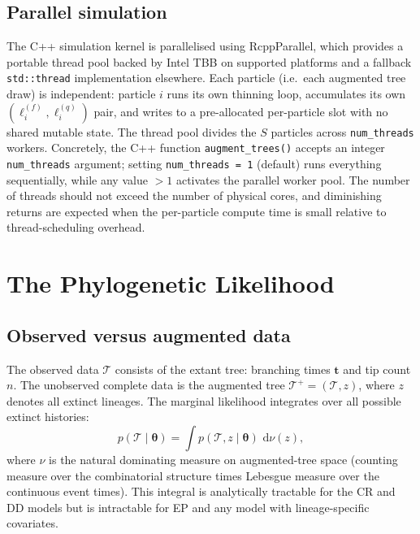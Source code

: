 \documentclass[12pt,a4paper]{article}
\newcommand{\obs}{\mathcal{T}}
\newcommand{\aug}{\mathcal{T}^+}
\newcommand{\brts}{\mathbf{t}}
\newcommand{\pars}{\bm{\theta}}
\newcommand{\logf}{\ell^{(f)}}
\newcommand{\logq}{\ell^{(q)}}
\newcommand{\dd}{\,\mathrm{d}}
\begin{document}
\subsection{Parallel simulation}

The C++ simulation kernel is parallelised using \textsf{RcppParallel}, which
provides a portable thread pool backed by Intel TBB on supported platforms and
a fallback \texttt{std::thread} implementation elsewhere. Each particle (i.e.\
each augmented tree draw) is independent: particle $i$ runs its own
thinning loop, accumulates its own $(\logf_i, \logq_i)$ pair, and writes to
a pre-allocated per-particle slot with no shared mutable state. The
thread pool divides the $S$ particles across \texttt{num\_threads} workers.
Concretely, the C++ function \texttt{augment\_trees()} accepts an integer
\texttt{num\_threads} argument; setting \texttt{num\_threads = 1} (default)
runs everything sequentially, while any value $>1$ activates the parallel
worker pool. The number of threads should not exceed the number of physical
cores, and diminishing returns are expected when the per-particle compute
time is small relative to thread-scheduling overhead.

\section{The Phylogenetic Likelihood}\label{sec:likelihood}

\subsection{Observed versus augmented data}

The observed data $\obs$ consists of the extant tree: branching times
$\brts$ and tip count $n$. The unobserved complete data is the augmented
tree $\aug = (\obs, z)$, where $z$ denotes all extinct lineages. The
marginal likelihood integrates over all possible extinct histories:
\begin{equation}\label{eq:marginal}
  p(\obs \mid \pars) = \int p(\obs, z \mid \pars) \, \dd\nu(z),
\end{equation}
where $\nu$ is the natural dominating measure on augmented-tree space
(counting measure over the combinatorial structure times Lebesgue measure
over the continuous event times). This integral is analytically tractable
for the CR and DD models \citep{etienne2012prolonged} but is intractable
for EP and any model with lineage-specific covariates.
\end{document}
